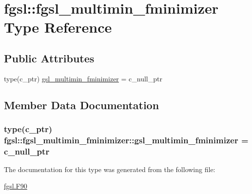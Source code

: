 \hypertarget{structfgsl_1_1fgsl__multimin__fminimizer}{\section{fgsl\-:\-:fgsl\-\_\-multimin\-\_\-fminimizer Type Reference}
\label{structfgsl_1_1fgsl__multimin__fminimizer}
}
\subsection*{Public Attributes}
\begin{DoxyCompactItemize}
\item 
type(c\-\_\-ptr) \hyperlink{structfgsl_1_1fgsl__multimin__fminimizer_a6ebb36f6ff0b14b6fe92d65a330cdbe1}{gsl\-\_\-multimin\-\_\-fminimizer} = c\-\_\-null\-\_\-ptr
\end{DoxyCompactItemize}


\subsection{Member Data Documentation}
\hypertarget{structfgsl_1_1fgsl__multimin__fminimizer_a6ebb36f6ff0b14b6fe92d65a330cdbe1}{
\subsubsection[{gsl\-\_\-multimin\-\_\-fminimizer}]{\setlength{\rightskip}{0pt plus 5cm}type(c\-\_\-ptr) fgsl\-::fgsl\-\_\-multimin\-\_\-fminimizer\-::gsl\-\_\-multimin\-\_\-fminimizer = c\-\_\-null\-\_\-ptr}}\label{structfgsl_1_1fgsl__multimin__fminimizer_a6ebb36f6ff0b14b6fe92d65a330cdbe1}


The documentation for this type was generated from the following file\-:\begin{DoxyCompactItemize}
\item 
\hyperlink{fgsl_8F90}{fgsl.\-F90}\end{DoxyCompactItemize}

